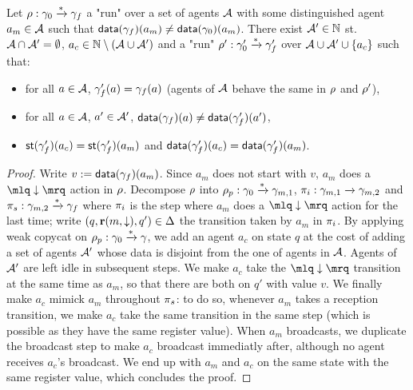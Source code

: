 \begin{lemma}\label{lem:strong_copycat}
Let $\rho : \gamma_0 \xrightarrow{*} \gamma_f$ a "run" over a set of agents $\mathcal{A}$ with some distinguished agent $a_m \in \mathcal{A}$ such that $\mathsf{data}(\gamma_f)(a_m) \ne \mathsf{data}(\gamma_0)(a_m)$. %
 There exist $\mathcal{A}' \in \mathbb{N}$ st. $\mathcal{A} \cap \mathcal{A}' = \emptyset$, $a_c \in \mathbb{N}\setminus (\mathcal{A} \cup \mathcal{A}')$ and a "run" $\rho': \gamma_0' \xrightarrow{*} \gamma_f'$ over $\mathcal{A} \cup \mathcal{A}' \cup \{a_c\}$ such that:
\begin{itemize}
\item for all $a \in \mathcal{A}$, $\gamma_f'(a) = \gamma_f(a)$ (agents of $\mathcal{A}$ behave the same in $\rho$ and $\rho'$),
\item for all $a \in \mathcal{A}$, $a' \in \mathcal{A}'$, $\mathsf{data}(\gamma_f)(a) \ne \mathsf{data}(\gamma_f')(a')$,
\item $\mathsf{st}(\gamma_f')(a_c) = \mathsf{st}(\gamma_f')(a_m)$ and $\mathsf{data}(\gamma_f')(a_c) = \mathsf{data}(\gamma_f')(a_m)$.
\end{itemize}
\end{lemma}
\begin{proof}
Write $v := \mathsf{data}(\gamma_f)(a_m)$. Since $a_m$ does not start with $v$, $a_m$ does a $\quotemarks{\enregact}$ action in $\rho$.
Decompose $\rho$ into $\rho_p: \gamma_0 \xrightarrow{*} \gamma_{m,1}$, $\pi_i: \gamma_{m,1} \xrightarrow{} \gamma_{m,2}$ and $\pi_s: \gamma_{m,2} \xrightarrow{*} \gamma_f$ where $\pi_i$ is the step where $a_m$ does a $\quotemarks{\enregact}$ action for the last time; write $(q,\textbf{r}(m, \downarrow),q') \in\Delta$ the transition taken by $a_m$ in $\pi_i$. By applying weak copycat on $\rho_p : \gamma_0 \xrightarrow{*} \gamma$, we add an agent $a_c$ on state $q$ at the cost of adding a set of agents $\mathcal{A}'$ whose data is disjoint from  the one of agents in $\mathcal{A}$. Agents of $\mathcal{A}'$ are left idle in subsequent steps. We make $a_c$ take the $\quotemarks{\enregact}$ transition at the same time as $a_m$, so that there are both on $q'$ with value $v$. We finally make $a_c$ mimick $a_m$ throughout $\pi_s$: to do so, whenever $a_m$ takes a reception transition, we make $a_c$ take the same transition in the same step (which is possible as they have the same register value). When $a_m$ broadcasts, we duplicate the broadcast step to make $a_c$ broadcast immediatly after, although no agent receives $a_c$'s broadcast. We end up with $a_m$ and $a_c$ on the same state with the same register value, which concludes the proof. 
 \end{proof}

